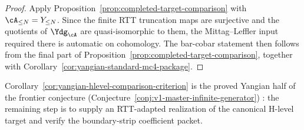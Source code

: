\begin{proof}
Apply Proposition~\ref{prop:completed-target-comparison} with
$\cA_{\le N}=Y_{\le N}$. Since the finite RTT truncation maps are
surjective and the quotients of $\Ydg_{\cA}$ are quasi-isomorphic to
them, the Mittag--Leffler input required there is automatic on
cohomology. The bar-cobar statement then follows from the final part
of Proposition~\ref{prop:completed-target-comparison}, together with
Corollary~\ref{cor:yangian-standard-mc4-package}.
\end{proof}

\begin{remark}
\label{rem:yangian-hlevel-comparison-criterion-application}
Corollary~\ref{cor:yangian-hlevel-comparison-criterion} is the proved
Yangian half of the frontier conjecture
\ifannalsedition\else
(Conjecture~\ref{conj:v1-master-infinite-generator})
\fi: the remaining step is to supply an RTT-adapted realization of the
canonical H-level target and verify the boundary-strip coefficient
packet.
\end{remark}

